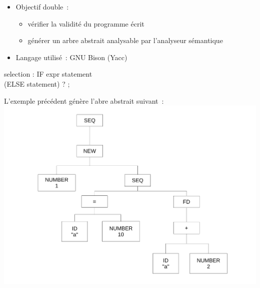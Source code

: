 \begin{frame}
	\begin{itemize}
	\item Objectif double~: 
		\begin{itemize}
		\item vérifier la validité du programme écrit
		\item générer un arbre abstrait analysable par l'analyseur sémantique
		\end{itemize}
	\item Langage utilisé~: GNU Bison (Yacc)
	\end{itemize}
\end{frame}

\begin{frame}[fragile]
	\begin{rail}
		selection : IF expr statement \\ (ELSE statement) ? ;
	\end{rail}
\end{frame}

\begin{frame}
L'exemple précédent génère l'abre abstrait suivant~:
\includegraphics[scale=0.3]{doc/Presentation/img/arbre.pdf}
\end{frame}
